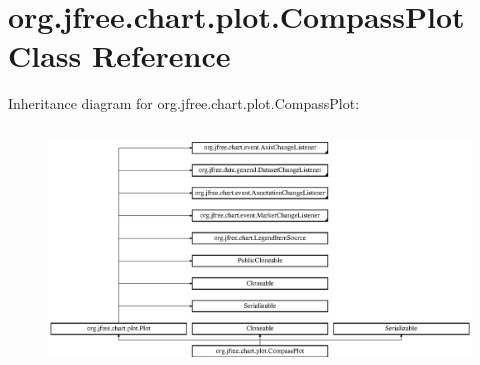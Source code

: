 \hypertarget{classorg_1_1jfree_1_1chart_1_1plot_1_1_compass_plot}{}\section{org.\+jfree.\+chart.\+plot.\+Compass\+Plot Class Reference}
\label{classorg_1_1jfree_1_1chart_1_1plot_1_1_compass_plot}
Inheritance diagram for org.\+jfree.\+chart.\+plot.\+Compass\+Plot\+:\begin{figure}[H]
\begin{center}
\leavevmode
\includegraphics[height=6.436782cm]{classorg_1_1jfree_1_1chart_1_1plot_1_1_compass_plot}
\end{center}
\end{figure}
